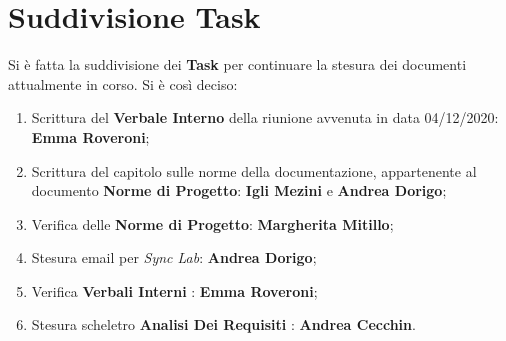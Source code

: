 	\section{Suddivisione Task}
	Si è fatta la suddivisione dei \textbf{Task} per continuare la stesura dei documenti attualmente in corso.
	Si è così deciso:
	\begin{enumerate}
		\item Scrittura del \textbf{Verbale Interno} della riunione avvenuta in data 04/12/2020: \textbf{Emma Roveroni};
		\item Scrittura del capitolo sulle norme della documentazione, appartenente al documento \textbf{Norme di Progetto}: \textbf{Igli Mezini} e \textbf{Andrea Dorigo};
		\item Verifica delle \textbf{Norme di Progetto}: \textbf{Margherita Mitillo};
		\item Stesura email per \textit{Sync Lab}: \textbf{Andrea Dorigo};
		\item Verifica \textbf{Verbali Interni} : \textbf{Emma Roveroni};
		\item Stesura scheletro \textbf{Analisi Dei Requisiti} : \textbf{Andrea Cecchin}.
	\end{enumerate}
